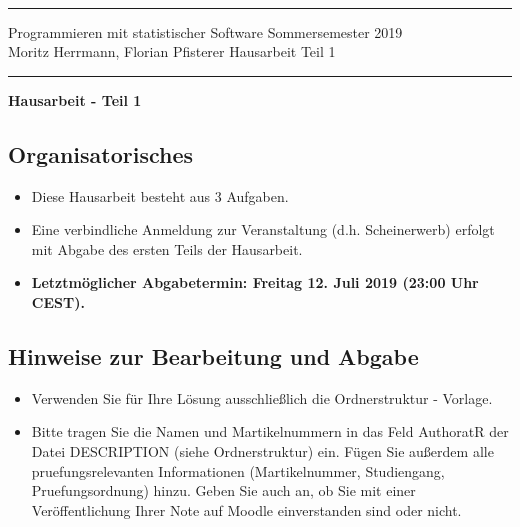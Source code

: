 \documentclass[a4paper]{article}
\begin{document}
  \sloppy \thispagestyle{empty} \setlength{\parindent}{0cm}
  \rule{0cm}{0cm}
  \vspace{-3.8cm}\\

  {\hrule \vspace{.2cm} {\sfbold Programmieren mit statistischer Software}\hfill
    {\sfbold Sommersemester 2019}\\
    {\sfbold Moritz Herrmann, Florian Pfisterer}\hfill {\sfbold
      Hausarbeit Teil 1}


    \vspace{.2cm} \hrule \vspace{1.5cm}

    \begin{center}
      {\bf \LARGE Hausarbeit - Teil 1}
    \end{center}

    \subsection*{Organisatorisches}
    \begin{itemize}
      \item Diese Hausarbeit besteht aus {3 Aufgaben}.
      \item Eine verbindliche Anmeldung zur Veranstaltung (d.h. Scheinerwerb) erfolgt mit Abgabe des ersten Teils der Hausarbeit.
      \item {\bf Letztmöglicher Abgabetermin: Freitag 12. Juli 2019 (23:00 Uhr CEST).}\\
    \end{itemize}

    \subsection*{Hinweise zur Bearbeitung und Abgabe}

    \begin{itemize}
      \item Verwenden Sie für Ihre Lösung ausschließlich die Ordnerstruktur - Vorlage.

      \item Bitte tragen Sie die Namen und Martikelnummern in das Feld AuthoratR der Datei DESCRIPTION (siehe Ordnerstruktur) ein.
       Fügen Sie außerdem alle pruefungsrelevanten Informationen (Martikelnummer, Studiengang, Pruefungsordnung) hinzu.
       Geben Sie auch an, ob Sie mit einer Veröffentlichung Ihrer Note auf Moodle einverstanden sind oder nicht.


\end{itemize}}
\end{document}
